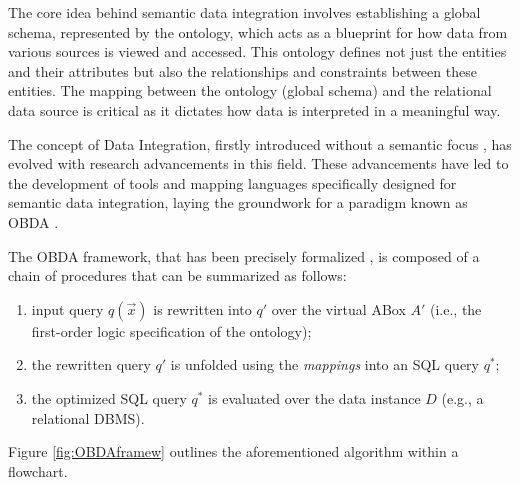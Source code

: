 The core idea behind semantic data integration involves establishing a global schema, represented by the ontology, which acts as a blueprint for how data from various sources is viewed and accessed. This ontology defines not just the entities and their attributes but also the relationships and constraints between these entities. The mapping between the ontology (global schema) and the relational data source is critical as it dictates how data is interpreted in a meaningful way.

The concept of Data Integration, firstly introduced without a semantic focus \cite{DBLP:conf/pods/Lenzerini02}, has evolved with research advancements in this field. These advancements have led to the development of tools and mapping languages specifically designed for semantic data integration, laying the groundwork for a paradigm known as \ac{OBDA} \cite{DBLP:conf/ijcai/XiaoCKLPRZ18}.

The \ac{OBDA} framework, that has been precisely formalized \cite{DBLP:conf/aiia/BotoevaCCCX18}, is composed of a chain of procedures that can be summarized as follows:
\begin{enumerate}
    \item input query ${q(\vec{x})}$ is rewritten \cite{DBLP:conf/otm/MakrisGBC10} into ${q'}$ over the virtual ABox ${A'}$ (i.e., the first-order logic specification of the ontology);
    \item the rewritten query ${q'}$ is unfolded using the \textit{mappings} into an \ac{SQL} query ${q^*}$;
    \item the optimized \ac{SQL} query ${q^*}$ is evaluated over the data instance ${D}$ (e.g., a relational \ac{DBMS}).
\end{enumerate}

Figure \ref{fig:OBDAframew} outlines the aforementioned algorithm within a flowchart.

